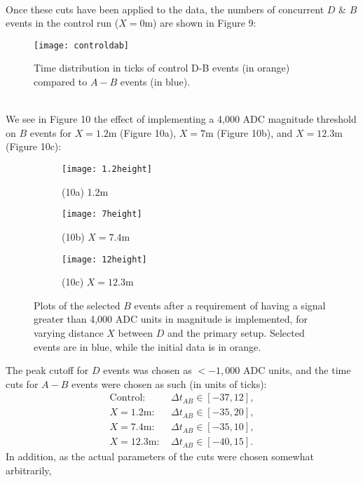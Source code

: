 \documentclass[a4paper]{article}
\begin{document}
\\
Once these cuts have been applied to the data, the numbers of concurrent $D$ \& $B$ events in the control run ($X = 0$m) are shown in Figure 9:
\begin{figure}[h!]
\begin{center}
	\texttt{[image: controldab]}
\end{center}
\caption{Time distribution in ticks of control D-B events (in orange) compared to $A-B$ events (in blue).}
\end{figure}
\\
We see in Figure 10 the effect of implementing a 4,000 ADC magnitude threshold on $B$ events for $X = 1.2$m (Figure 10a), $X = 7$m (Figure 10b), and $X=12.3$m (Figure 10c):
\begin{figure}[h!]
\centering
	 \begin{subfigure}[t!]{0.4\textwidth}
		 \centering
		 \texttt{[image: 1.2height]}
		 \caption*{(10a) 1.2m}
	 \end{subfigure}
	 \hfill
	 \begin{subfigure}[t!]{0.4\textwidth}
		 \centering
		 \texttt{[image: 7height]}
		 \caption*{(10b) $X=7.4$m}
	 \end{subfigure}
	 \hfill
	 \begin{subfigure}[t!]{0.4\textwidth}
		 \centering
		 \texttt{[image: 12height]}
		 \caption*{(10c) $X=12.3$m}
	 \end{subfigure}
	 \caption{Plots of the selected $B$ events after a requirement of having a signal greater than 4,000 ADC units in magnitude is implemented, for varying distance $X$ between $D$ and the primary setup. Selected events are in blue, while the initial data is in orange.}
\end{figure}
\newpage \noindent
The peak cutoff for $D$ events was chosen as $<-1,000$ ADC units, and the time cuts for $A-B$ events were chosen as such (in units of ticks):
\begin{align*}
	\text{Control}: & \:\Delta t_{AB} \in \left[ -37, 12 \right],\\
	\text{$X=1.2$m}: & \: \Delta t_{AB} \in \left[ -35, 20 \right],\\
	\text{$X=7.4$m}: & \: \Delta t_{AB} \in \left[ -35, 10 \right],\\
	\text{$X=12.3$m}: &\: \Delta t_{AB} \in \left[ -40, 15 \right].
\end{align*}
In addition, as the actual parameters of the cuts were chosen somewhat arbitrarily,
\end{document}
